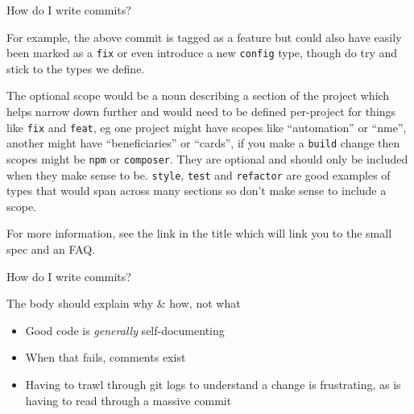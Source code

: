 \documentclass[presentation]{beamer}
\begin{document}
\begin{frame}[label={sec:org111874a},fragile]{How do I write commits?}
{For example, the above commit is tagged as a feature but could also have easily been marked as a \texttt{fix} or even introduce a new \texttt{config} type, though do try and stick to the types we define.

The optional scope would be a noun describing a section of the project which helps narrow down further and would need to be defined per-project for things like \texttt{fix} and \texttt{feat}, eg one project might have scopes like ``automation'' or ``nme'', another might have ``beneficiaries'' or ``cards'', if you make a \texttt{build} change then scopes might be \texttt{npm} or \texttt{composer}. They are optional and should only be included when they make sense to be. \texttt{style}, \texttt{test} and \texttt{refactor} are good examples of types that would span across many sections so don't make sense to include a scope.

For more information, see the link in the title which will link you to the small spec and an FAQ.
\normalsize}
\end{frame}

\begin{frame}[label={sec:org65212c9}]{How do I write commits?}
\begin{block}{The body should explain why \& how, not what}
\begin{itemize}
\item Good code is \emph{generally} self-documenting
\item When that fails, comments exist
\item Having to trawl through git logs to understand a change is frustrating, as is having to read through a massive commit
\end{itemize}
\end{block}

\end{frame}
\end{document}
